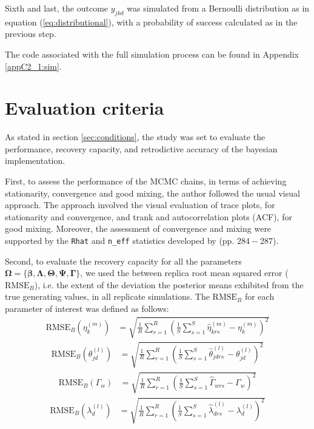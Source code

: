 Sixth and last, the outcome $y_{jkd}$ was simulated from a Bernoulli distribution as in equation (\ref{eq:distributional}), with a probability of success calculated as in the previous step. 

The code associated with the full simulation process can be found in Appendix \ref{appC2_1:sim}.


\section{Evaluation criteria}

As stated in section \ref{sec:conditions}, the study was set to evaluate the performance, recovery capacity, and retrodictive accuracy of the bayesian implementation.

First, to assess the performance of the MCMC chains, in terms of achieving stationarity, convergence and good mixing, the author followed the usual visual approach. The approach involved the visual evaluation of trace plots, for stationarity and convergence, and trank and autocorrelation plots (ACF), for good mixing. Moreover, the assessment of convergence and mixing were supported by the \texttt{Rhat} and \texttt{n\_eff} statistics developed by \citet{Gelman_et_al_2014} (pp. $284-287$).

Second, to evaluate the recovery capacity for all the parameters $\pmb{\Omega} = \{ \pmb{\beta}, \pmb{\Lambda}, \pmb{\Theta}, \pmb{\Psi}, \pmb{\Gamma} \}$, we used the between replica root mean squared error ($\text{RMSE}_{B}$), i.e. the extent of the deviation the posterior means exhibited from the true generating values, in all replicate simulations. The $\text{RMSE}_{B}$ for each parameter of interest was defined as follows:
%
\begin{align}
	\text{RMSE}_{B} \left( \eta^{(m)}_{k} \right) &=\sqrt{\frac{1}{R} \sum_{r=1}^{R} \left( \frac{1}{S} \sum_{s=1}^{S} \hat{\eta}^{(m)}_{krs} - \eta^{(m)}_{k} \right)^2}
\end{align}
%
\begin{align}
	\text{RMSE}_{B} \left( \theta^{(l)}_{jd} \right) &=\sqrt{\frac{1}{R} \sum_{r=1}^{R} \left( \frac{1}{S} \sum_{s=1}^{S} \hat{\theta}^{(l)}_{jdrs} - \theta^{(l)}_{jd} \right)^2} 
\end{align}
%
\begin{align}
	\text{RMSE}_{B} \left( \Gamma_{w} \right) &=\sqrt{\frac{1}{R} \sum_{r=1}^{R} \left( \frac{1}{S} \sum_{s=1}^{S} \hat{\Gamma}_{wrs} - \Gamma_{w} \right)^2}
\end{align}
%
\begin{align}
	\text{RMSE}_{B} \left( \lambda^{(l)}_{d} \right) &=\sqrt{\frac{1}{R} \sum_{r=1}^{R} \left( \frac{1}{S} \sum_{s=1}^{S} \hat{\lambda}^{(l)}_{drs} - \lambda^{(l)}_{d} \right)^2}
\end{align}


